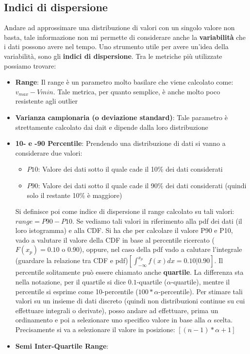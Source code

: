 \subsection{Indici di dispersione}
Andare ad approssimare una distribuzione di valori con un singolo valore non basta, tale informazione non mi permette di considerare anche la \textbf{variabilità} che i dati possono avere nel tempo.
Uno strumento utile per avere un'idea della variabilità, sono gli \textbf{indici di dispersione}. Tra le metriche più utilizzate possiamo trovare:
\begin{itemize}
\item \textbf{Range}: Il range è un parametro molto basilare che viene calcolato come: \(v_{max} - V{min}\). Tale metrica, per quanto semplice, è anche molto poco resistente agli outlier
\item \textbf{Varianza campionaria (o deviazione standard)}: Tale parametro è strettamente calcolato dai dait e dipende dalla loro distribuzione
\item \textbf{10- e -90 Percentile}: Prendendo una distribuzione di dati si vanno a considerare due valori:
\begin{itemize}
    \item \textbf{\(P10\)}: Valore dei dati sotto il quale cade il 10\% dei dati considerati
    \item \textbf{\(P90\)}: Valore dei dati sotto il quale cade il 90\% dei dati considerati (quindi solo il restante 10\% è maggiore)
\end{itemize}
Si definisce poi come indice di dispersione il range calcolato su tali valori: \(range = P90-P10\). Se vediamo tali valori in riferimento alla pdf dei dati (il loro istogramma) e alla CDF. Si ha che per calcolare il valore P90 e P10, vado a valutare il valore della CDF in base al percentile ricercato (\(F(x_p) = 0.10\) o \(0.90\)), oppure, nel caso della pdf vado a calutare l'integrale (guardare la relazione tra CDF e pdf)\(\left [\int_{-\infty}^{x_p}f(x)dx = 0.10 | 0.90\right ]\). Il percentile solitamente può essere chiamato anche \textbf{quartile}. La differenza sta nella notazione, per il quartile si dice \(0.1\)-quartile (\(\alpha\)-quartile), mentre il percentile si esprime come 10-percentile (\(100*\alpha\)-percentile). Per stimare tali valori su un insieme di dati discreto (quindi non distribuzioni continue su cui effettuare integrali o derivate), posso andare ad effettuare, prima un ordinamento e poi a selezionare uno specifico valore in base alla \(\alpha\) scelta. Precisamente si va a selezionare il valore in posizione: \([(n-1)*\alpha + 1]\)

\item \textbf{Semi Inter-Quartile Range}:

\end{itemize}